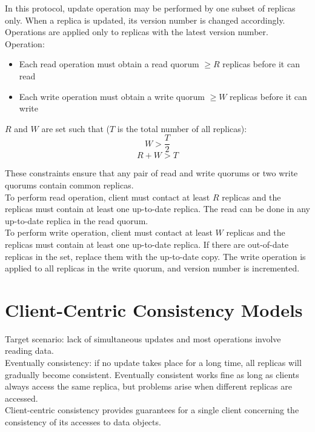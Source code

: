 \begin{multicols*}{2}
\noindent In this protocol, update operation may be performed by one subset of replicas only. When a replica is updated, its version number is changed accordingly. Operations are applied only to replicas with the latest version number.\\

\noindent Operation:
\begin{itemize}
  \item Each read operation must obtain a read quorum $\ge R$ replicas before it can read
  \item Each write operation must obtain a write quorum $\ge W$ replicas before it can write
\end{itemize}

\noindent $R$ and $W$ are set such that ($T$ is the total number of all replicas):
$$W > \frac{T}{2}$$
$$R+W > T$$

\noindent These constraints ensure that any pair of read and write quorums or two write quorums contain common replicas.\\

\noindent To perform read operation, client must contact at least $R$ replicas and the replicas must contain at least one up-to-date replica. The read can be done in any up-to-date replica in the read quorum. \\

\noindent To perform write operation, client must contact at least $W$ replicas and the replicas must contain at least one up-to-date replica. If there are out-of-date replicas in the set, replace them with the up-to-date copy. The write operation is applied to all replicas in the write quorum, and version number is incremented. 

\section{Client-Centric Consistency Models}

\noindent Target scenario: lack of simultaneous updates and most operations involve reading data.\\

\noindent Eventually consistency: if no update takes place for a long time, all replicas will gradually become consistent. Eventually consistent works fine as long as clients always access the same replica, but problems arise when different replicas are accessed. \\

\noindent Client-centric consistency provides guarantees for a single client concerning the consistency of its accesses to data objects.


\end{multicols*}
